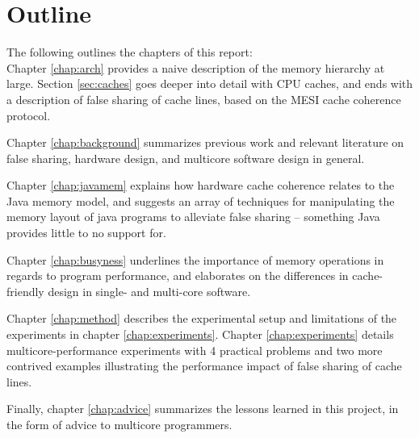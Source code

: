 \section{Outline}
The following outlines the chapters of this report:\\
Chapter \ref{chap:arch} provides a naive description of the memory hierarchy at
large. Section \ref{sec:caches} goes deeper into detail with CPU
caches, and ends with a description of false sharing of cache lines, based on
the MESI cache coherence protocol.

Chapter \ref{chap:background} summarizes previous work and relevant literature
on false sharing, hardware design, and multicore software design in general.

Chapter \ref{chap:javamem} explains how hardware cache coherence relates to the
Java memory model, and suggests an array of techniques for
manipulating the memory layout of java programs to alleviate false sharing --
something Java provides little to no support for.

Chapter \ref{chap:busyness} underlines the importance of memory operations in
regards to program performance, and elaborates on the differences in cache-friendly
design in single- and multi-core software.

Chapter \ref{chap:method} describes the experimental setup and limitations of the
experiments in chapter \ref{chap:experiments}.
Chapter \ref{chap:experiments} details multicore-performance experiments with 4
practical problems and two more contrived examples illustrating the performance
impact of false sharing of cache lines.

Finally, chapter \ref{chap:advice} summarizes the lessons learned in this
project, in the form of advice to multicore programmers.

